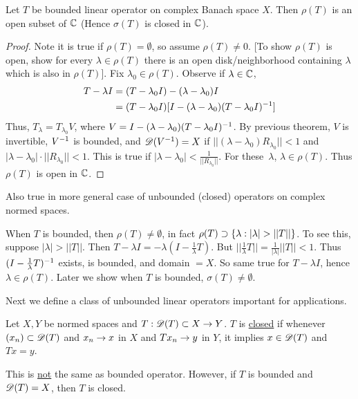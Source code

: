 \documentclass[]{article}
\begin{document}
\begin{theorem}
	Let $T$ be bounded linear operator on complex Banach space $X$.
	Then $\rho(T)$ is an open subset of $\mathbb{C}$ (Hence $\sigma(T)$ is closed in $\mathbb{C}$).
\end{theorem}
\begin{proof}
	Note it is true if $\rho(T)=\emptyset$, so assume $\rho(T)\neq0$.
	[To show $\rho(T)$ is open, show for every $\lambda\in\rho(T)$ there is an open disk/neighborhood containing $\lambda$ which is also in $\rho(T)$].
	Fix $\lambda_0\in\rho(T)$. Observe if $\lambda\in\mathbb{C}$,
	\begin{align*}
		T-\lambda I &= (T-\lambda_0I)-(\lambda-\lambda_0)I \\
					&= (T-\lambda_0I)[I-(\lambda-\lambda_0)(T-\lambda_0I)^{-1}]
	\end{align*}
	Thus, $ T_\lambda = T_{\lambda_0} V$, where $V = I-(\lambda-\lambda_0)(T-\lambda_0I)^{-1}$.
	By previous theorem, $V$ is invertible, $V^{-1}$ is bounded, and $\mathscr{D}(V^{-1})=X$ if $||(\lambda-\lambda_0)R_{\lambda_0}|| < 1$ and $|\lambda-\lambda_0|\cdot||R_{\lambda_0}||<1$.
	This is true if $|\lambda-\lambda_0|<\frac1{||R_{\lambda_0}||}$.
	For these~$\lambda$, $\lambda\in\rho(T)$.
	Thus $\rho(T)$ is open in $\mathbb{C}$.
\end{proof}
Also true in more general case of unbounded (closed) operators on complex normed spaces.
\begin{note}
	When $T$ is bounded, then $\rho(T)\neq\emptyset$, in fact $\rho(T)\supset\setc\lambda{|\lambda|>||T||}$.
	To see this, suppose $|\lambda|>||T||$. Then $T-\lambda I = -\lambda(I-\frac1\lambda T)$.
	But $||\frac1\lambda T||=\frac1{|\lambda|}||T||<1$.
	Thus $(I-\frac1\lambda T)^{-1}$ exists, is bounded, and domain $=X$.
	So same true for $T-\lambda I$, hence $\lambda\in\rho(T)$.
	Later we show when $T$ is bounded, $\sigma(T)\neq\emptyset$.
\end{note}
Next we define a class of unbounded linear operators important for applications.
\begin{definition}
	Let $X,Y$ be normed spaces and $T:\mathscr{D}(T)\subset X\rightarrow Y$.
	$T$ is \ul{closed} if whenever $(x_n)\subset\mathscr{D}(T)$ and $x_n\rightarrow x$ in $X$ and $Tx_n\rightarrow y$ in $Y$, it implies $x\in\mathscr{D}(T)$ and $Tx=y$.
\end{definition}
\begin{note}
	This is \ul{not} the same as bounded operator.
	However, if $T$ is bounded and $\mathscr{D}(T)=X$, then $T$ is closed.
\end{note}
\end{document}
